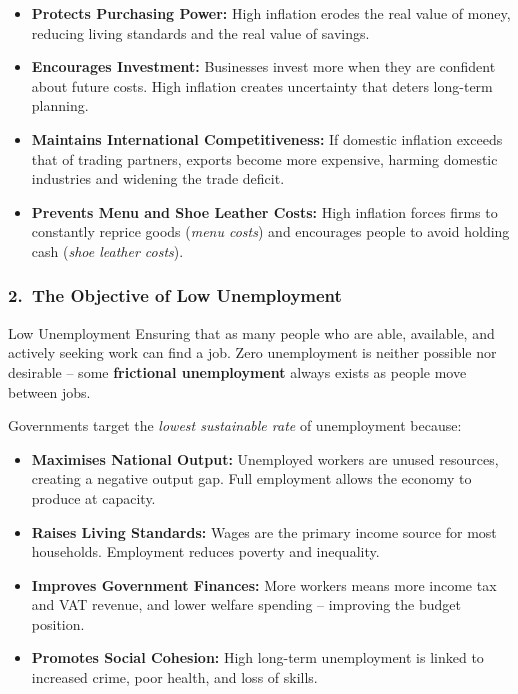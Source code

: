 \documentclass[11pt, a4paper, twoside]{book}
\begin{document}
\begin{itemize}
  \item \textbf{Protects Purchasing Power:} High inflation erodes the real value of money, reducing living standards and the real value of savings.
  \item \textbf{Encourages Investment:} Businesses invest more when they are confident about future costs. High inflation creates uncertainty that deters long-term planning.
  \item \textbf{Maintains International Competitiveness:} If domestic inflation exceeds that of trading partners, exports become more expensive, harming domestic industries and widening the trade deficit.
  \item \textbf{Prevents Menu and Shoe Leather Costs:} High inflation forces firms to constantly reprice goods (\emph{menu costs}) and encourages people to avoid holding cash (\emph{shoe leather costs}).
\end{itemize}

\subsubsection{2.\ The Objective of Low Unemployment}

\begin{keyterm}{Low Unemployment}
Ensuring that as many people who are able, available, and actively seeking work can find a job. Zero unemployment is neither possible nor desirable -- some \textbf{frictional unemployment} always exists as people move between jobs.
\end{keyterm}

Governments target the \emph{lowest sustainable rate} of unemployment because:

\begin{itemize}
  \item \textbf{Maximises National Output:} Unemployed workers are unused resources, creating a negative output gap. Full employment allows the economy to produce at capacity.
  \item \textbf{Raises Living Standards:} Wages are the primary income source for most households. Employment reduces poverty and inequality.
  \item \textbf{Improves Government Finances:} More workers means more income tax and VAT revenue, and lower welfare spending -- improving the budget position.
  \item \textbf{Promotes Social Cohesion:} High long-term unemployment is linked to increased crime, poor health, and loss of skills.
\end{itemize}
\end{document}
